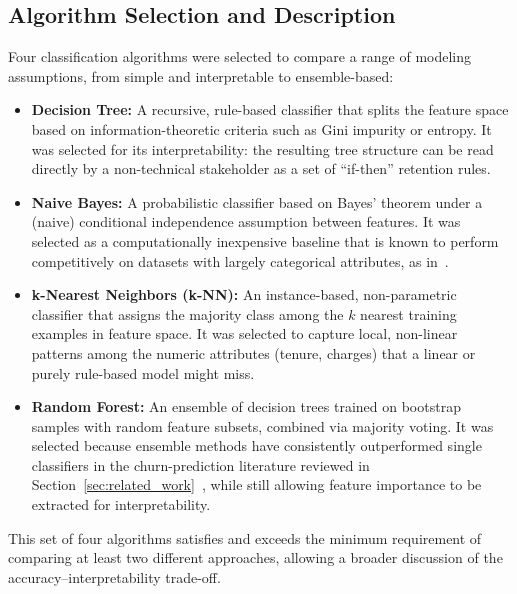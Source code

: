 \documentclass[conference]{IEEEtran}
\begin{document}
	\subsection{Algorithm Selection and Description}
	Four classification algorithms were selected to compare a range of modeling assumptions, from simple and interpretable to ensemble-based:
	\begin{itemize}
		\item \textbf{Decision Tree:} A recursive, rule-based classifier that splits the feature space based on information-theoretic criteria such as Gini impurity or entropy. It was selected for its interpretability: the resulting tree structure can be read directly by a non-technical stakeholder as a set of ``if-then'' retention rules.
		\item \textbf{Naive Bayes:} A probabilistic classifier based on Bayes' theorem under a (naive) conditional independence assumption between features. It was selected as a computationally inexpensive baseline that is known to perform competitively on datasets with largely categorical attributes, as in~\cite{b2}.
		\item \textbf{k-Nearest Neighbors (k-NN):} An instance-based, non-parametric classifier that assigns the majority class among the $k$ nearest training examples in feature space. It was selected to capture local, non-linear patterns among the numeric attributes (tenure, charges) that a linear or purely rule-based model might miss.
		\item \textbf{Random Forest:} An ensemble of decision trees trained on bootstrap samples with random feature subsets, combined via majority voting. It was selected because ensemble methods have consistently outperformed single classifiers in the churn-prediction literature reviewed in Section~\ref{sec:related_work}~\cite{b1,b3}, while still allowing feature importance to be extracted for interpretability.
	\end{itemize}
	This set of four algorithms satisfies and exceeds the minimum requirement of comparing at least two different approaches, allowing a broader discussion of the accuracy--interpretability trade-off.
	
\end{document}

